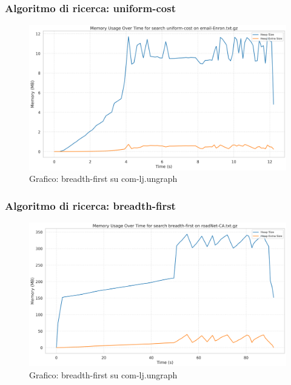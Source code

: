 \documentclass{article}
\begin{document}
\subsubsection{Algoritmo di ricerca: uniform-cost}
\begin{figure}[h]\centering
\includegraphics[width=\textwidth]{../plots/email-Enron_uniform-cost.png}
\caption{Grafico: breadth-first su com-lj.ungraph}
\end{figure}
\subsubsection{Algoritmo di ricerca: breadth-first}
\begin{figure}[h]\centering
\includegraphics[width=\textwidth]{../plots/roadNet-CA_breadth-first.png}
\caption{Grafico: breadth-first su com-lj.ungraph}
\end{figure}
\end{document}
